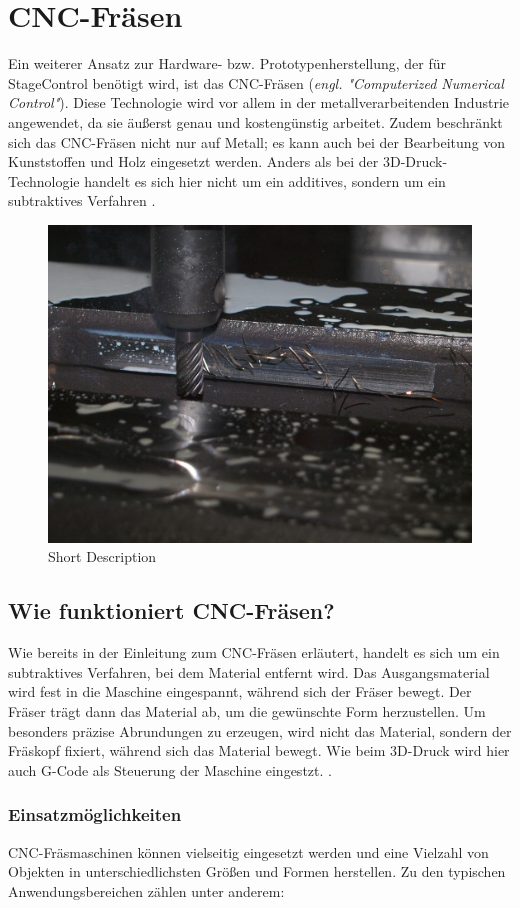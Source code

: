 \section{CNC-Fräsen}

Ein weiterer Ansatz zur Hardware- bzw. Prototypenherstellung, der für StageControl benötigt wird, ist das CNC-Fräsen (\emph{engl. "Computerized Numerical Control"}). Diese Technologie wird vor allem in der metallverarbeitenden Industrie angewendet, da sie äußerst genau und kostengünstig arbeitet. Zudem beschränkt sich das CNC-Fräsen nicht nur auf Metall; es kann auch bei der Bearbeitung von Kunststoffen und Holz eingesetzt werden. Anders als bei der 3D-Druck-Technologie handelt es sich hier nicht um ein additives, sondern um ein subtraktives Verfahren \cite{CNC-Fräsen} \cite{CNC-Fräsen_2} \cite{CNC-Fräsen_3}.


\begin{figure}[H]
	\centering
	\includegraphics[width=0.5\linewidth]{images/CNC.jpg}
	\caption[Short Description]{Short Description}
	\label{fig:sz-ybbs-logo}
\end{figure}

\subsection{Wie funktioniert CNC-Fräsen?}
Wie bereits in der Einleitung zum CNC-Fräsen erläutert, handelt es sich um ein subtraktives Verfahren, bei dem Material entfernt wird. Das Ausgangsmaterial wird fest in die Maschine eingespannt, während sich der Fräser bewegt. Der Fräser trägt dann das Material ab, um die gewünschte Form herzustellen. Um besonders präzise Abrundungen zu erzeugen, wird nicht das Material, sondern der Fräskopf fixiert, während sich das Material bewegt. Wie beim 3D-Druck wird hier auch G-Code als Steuerung der Maschine eingestzt. \cite{CNC-Fräsen_2} \cite{CNC-Fräsen_3}.


\subsubsection{Einsatzmöglichkeiten}
CNC-Fräsmaschinen können vielseitig eingesetzt werden und eine Vielzahl von Objekten in unterschiedlichsten Größen und Formen herstellen. Zu den typischen Anwendungsbereichen zählen unter anderem:


